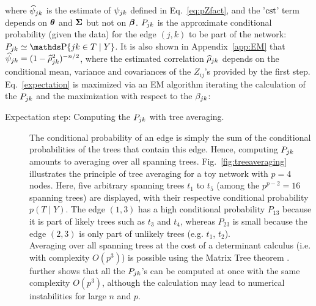 where $\widehat{\psi}_{jk}$ is the estimate of $\psi_{jk}$ defined in Eq.~\eqref{eq:pZfact}, and the '$\text{cst}$' term depends on ${\boldsymbol{\theta}}$ and ${\boldsymbol{\Sigma}}$ but not on ${\boldsymbol{\beta}}$. 
$P_{jk}$ is the approximate conditional probability (given the data) for the edge $(j, k)$ to be part of the network:
$P_\jk \simeq \prob\{jk \in T \; | \; Y\}$.
It is also shown in Appendix~\ref{app:EM} that $\widehat{\psi}_{jk} = (1-\widehat{\rho}_{jk}^2)^{-n/2}$, where the estimated correlation $\widehat{\rho}_{jk}$ depends on the conditional mean, variance and covariances of the $Z_{ij}$'s provided by the first step.
 Eq.~\eqref{expectation} is maximized via an EM algorithm iterating the calculation of the $P_{jk}$ and the maximization with respect to the $\beta_{jk}$:
\begin{description}

\item[Expectation step: Computing the $P_{jk}$ with tree averaging.] The conditional probability of an edge is simply the sum of the conditional probabilities of the trees that contain this edge. Hence, computing $P_{jk}$ amounts to averaging over all spanning trees.
Fig.~\ref{fig:treeaveraging} illustrates the principle of tree averaging for a toy network with $p=4$ nodes. Here, five arbitrary spanning trees $t_1$ to $t_5$ (among the $p^{p-2} = 16$ spanning trees) are displayed, with their respective conditional probability $p(T \mid Y)$. 
The edge $(1, 3)$ has a high conditional probability $P_{13}$ because it is part of likely trees such as $t_3$ and $t_4$, whereas $P_{23}$ is small because the edge $(2, 3)$ is only part of unlikely trees (e.g. $t_1$, $t_2$). \\
Averaging over all spanning trees at the cost of a determinant calculus (i.e. with complexity $O(p^3)$) is possible using the Matrix Tree theorem \citep[][recalled as Theorem~\ref{thm:MTT2} in Appendix~\ref{app:MTT}]{matrixtree}. 
\citet{kirshner} further shows that all the $P_{jk}$'s can be computed at once with the same complexity $O(p^3)$, although the calculation may lead to numerical instabilities for large $n$ and $p$.




\end{description}
